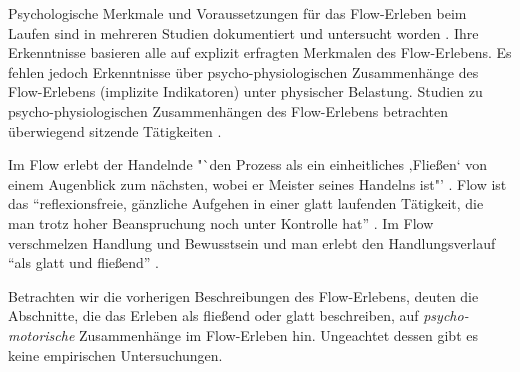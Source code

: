 Psychologische Merkmale und Voraussetzungen für das Flow-Erleben beim Laufen sind in mehreren Studien dokumentiert und untersucht worden \citep{Stoll2005, Reinhardt2006, Schuler2009, Jimenez-Torres2013}. Ihre Erkenntnisse basieren alle auf explizit erfragten Merkmalen des Flow-Erlebens. Es fehlen jedoch Erkenntnisse über psycho-physiologischen Zusammenhänge des Flow-Erlebens (implizite Indikatoren) unter physischer Belastung. Studien zu psycho-physiologischen Zusammenhängen des Flow-Erlebens betrachten überwiegend sitzende Tätigkeiten \citep{deManzano2010, Keller2011, Peifer2014, Tozman2015}. 

Im Flow erlebt der Handelnde "`den Prozess als ein einheitliches ‚Fließen‘ von einem Augenblick zum nächsten, wobei er Meister seines Handelns ist"' \citep[][S.~59]{Csikszentmihalyi2010}. Flow ist das "`reflexionsfreie, gänzliche Aufgehen in einer glatt laufenden Tätigkeit, die man trotz hoher Beanspruchung noch unter Kontrolle hat"' \citep[][S.~156]{Rheinberg2003}. Im Flow verschmelzen Handlung und Bewusstsein und man erlebt den Handlungsverlauf "`als glatt und fließend"' \citep[][S.~13]{Henk2014}.

Betrachten wir die vorherigen Beschreibungen des Flow-Erlebens, deuten die Abschnitte, die das Erleben als fließend oder glatt beschreiben, auf \emph{psycho-motorische} Zusammenhänge im Flow-Erleben hin. Ungeachtet dessen gibt es keine empirischen Untersuchungen.



